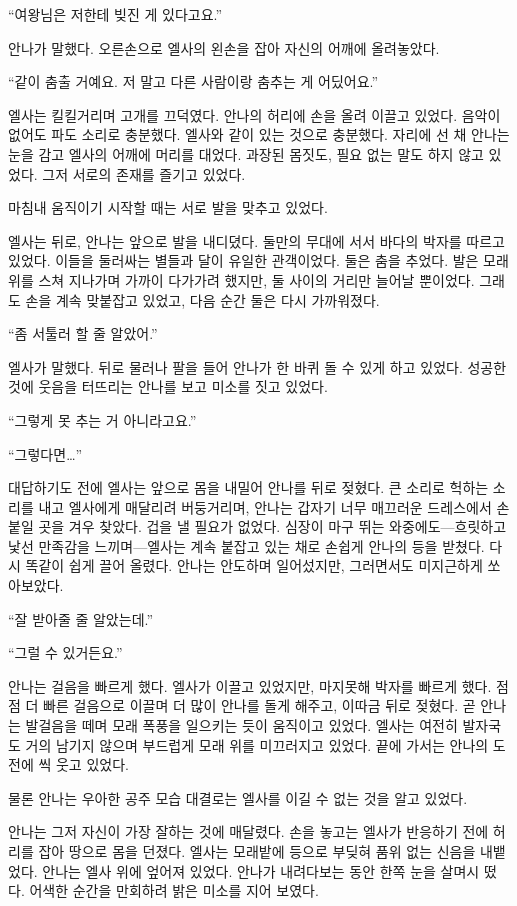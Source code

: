 ``여왕님은 저한테 빚진 게 있다고요.''

안나가 말했다. 오른손으로 엘사의 왼손을 잡아 자신의 어깨에 올려놓았다.

``같이 춤출 거예요. 저 말고 다른 사람이랑 춤추는 게 어딨어요.''

엘사는 킬킬거리며 고개를 끄덕였다. 안나의 허리에 손을 올려 이끌고 있었다. 음악이 없어도 파도 소리로 충분했다. 엘사와 같이 있는 것으로 충분했다. 자리에 선 채 안나는 눈을 감고 엘사의 어깨에 머리를 대었다. 과장된 몸짓도, 필요 없는 말도 하지 않고 있었다. 그저 서로의 존재를 즐기고 있었다.

마침내 움직이기 시작할 때는 서로 발을 맞추고 있었다.

엘사는 뒤로, 안나는 앞으로 발을 내디뎠다. 둘만의 무대에 서서 바다의 박자를 따르고 있었다. 이들을 둘러싸는 별들과 달이 유일한 관객이었다. 둘은 춤을 추었다. 발은 모래 위를 스쳐 지나가며 가까이 다가가려 했지만, 둘 사이의 거리만 늘어날 뿐이었다. 그래도 손을 계속 맞붙잡고 있었고, 다음 순간 둘은 다시 가까워졌다.

``좀 서툴러 할 줄 알았어.''

엘사가 말했다. 뒤로 물러나 팔을 들어 안나가 한 바퀴 돌 수 있게 하고 있었다. 성공한 것에 웃음을 터뜨리는 안나를 보고 미소를 짓고 있었다.

``그렇게 못 추는 거 아니라고요.''

``그렇다면\ldots''

대답하기도 전에 엘사는 앞으로 몸을 내밀어 안나를 뒤로 젖혔다. 큰 소리로 헉하는 소리를 내고 엘사에게 매달리려 버둥거리며, 안나는 갑자기 너무 매끄러운 드레스에서 손 붙일 곳을 겨우 찾았다. 겁을 낼 필요가 없었다. 심장이 마구 뛰는 와중에도—흐릿하고 낯선 만족감을 느끼며—엘사는 계속 붙잡고 있는 채로 손쉽게 안나의 등을 받쳤다. 다시 똑같이 쉽게 끌어 올렸다. 안나는 안도하며 일어섰지만, 그러면서도 미지근하게 쏘아보았다.

``잘 받아줄 줄 알았는데.''

``그럴 수 있거든요.''

안나는 걸음을 빠르게 했다. 엘사가 이끌고 있었지만, 마지못해 박자를 빠르게 했다. 점점 더 빠른 걸음으로 이끌며 더 많이 안나를 돌게 해주고, 이따금 뒤로 젖혔다. 곧 안나는 발걸음을 떼며 모래 폭풍을 일으키는 듯이 움직이고 있었다. 엘사는 여전히 발자국도 거의 남기지 않으며 부드럽게 모래 위를 미끄러지고 있었다. 끝에 가서는 안나의 도전에 씩 웃고 있었다.

물론 안나는 우아한 공주 모습 대결로는 엘사를 이길 수 없는 것을 알고 있었다.

안나는 그저 자신이 가장 잘하는 것에 매달렸다. 손을 놓고는 엘사가 반응하기 전에 허리를 잡아 땅으로 몸을 던졌다. 엘사는 모래밭에 등으로 부딪혀 품위 없는 신음을 내뱉었다. 안나는 엘사 위에 엎어져 있었다. 안나가 내려다보는 동안 한쪽 눈을 살며시 떴다. 어색한 순간을 만회하려 밝은 미소를 지어 보였다.

